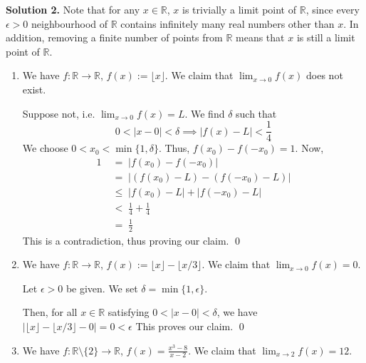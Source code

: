 \documentclass[10pt]{article}
\begin{document}
        \textbf{Solution 2.}
        Note that for any $x \in \mathbb{R}$, $x$ is trivially a limit point of $\mathbb{R}$, since every $\epsilon > 0$ neighbourhood
        of $\mathbb{R}$ contains infinitely many real numbers other than $x$.
        In addition, removing a finite number of points from $\mathbb{R}$ means that $x$ is still a limit point of $\mathbb{R}$.
        \begin{enumerate}
                \item We have $f\colon \mathbb{R} \to \mathbb{R}$, $f(x) := \lfloor x \rfloor$.
                We claim that $\lim_{x \to 0} f(x)$ does not exist.

                Suppose not, i.e. $\lim_{x\to 0} f(x) = L$.
                We find $\delta$ such that
                \[
                0 < |x - 0| < \delta \implies |f(x) - L| < \frac{1}{4}
                \]
                We choose $0 < x_0 < \min\{1, \delta\}$. Thus, $f(x_0) - f(-x_0) = 1$. Now,
                \begin{align*}
                        1 \;&=\; |f(x_0) - f(-x_0)| \\
                                \;&=\; |(f(x_0) - L) - (f(-x_0) - L)| \\
                                \;&\le\; |f(x_0) - L| + |f(-x_0) - L| \\
                                \;&<\; \frac{1}{4} + \frac{1}{4} \\
                                \;&=\; \frac{1}{2}
                \end{align*}
                This is a contradiction, thus proving our claim. \qed
                
                \item We have $f\colon \mathbb{R} \to \mathbb{R}$, $f(x) := \lfloor x\rfloor - \lfloor x/3\rfloor$.
                We claim that $\lim_{x\to 0} f(x) = 0$.

                Let $\epsilon > 0$ be given.
                We set $\delta = \min\{1, \epsilon\}$.
 
                Then, for all $x \in \mathbb{R}$ satisfying $0 < |x - 0| < \delta$,
                we have 
                $|\lfloor x\rfloor - \lfloor x/3\rfloor - 0| = 0 < \epsilon$
                This proves our claim. \qed

                \item We have $f\colon \mathbb{R}\setminus\{2\} \to \mathbb{R}$, $f(x) = \frac{x^3 - 8}{x - 2}$.
                We claim that $\lim_{x\to 2} f(x) = 12$.


\end{enumerate}
\end{document}
